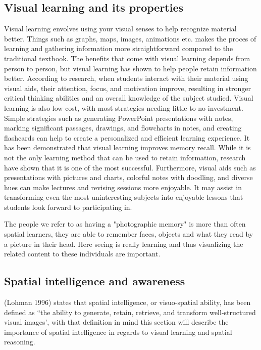 \subsection{Visual learning and its properties}\label{subsec:visualLearningAndItsProperties}
Visual learning envolves using your visual senses to help recognize material better. Things such as graphs, maps, images, animations etc. makes the proces of learning and gathering information more straightforward compared to the traditional textbook. The benefits that come with visual learning depends from person to person, but visual learning has shown to help people retain information better.
According to research, when students interact with their material using visual aids, their attention, focus, and motivation improve, resulting in stronger critical thinking abilities and an overall knowledge of the subject studied. Visual learning is also low-cost, with most strategies needing little to no investment. Simple strategies such as generating PowerPoint presentations with notes, marking significant passages, drawings, and flowcharts in notes, and creating flashcards can help to create a personalized and efficient learning experience.
It has been demonstrated that visual learning improves memory recall. While it is not the only learning method that can be used to retain information, research have shown that it is one of the most successful. Furthermore, visual aids such as presentations with pictures and charts, colorful notes with doodling, and diverse hues can make lectures and revising sessions more enjoyable.
It may assist in transforming even the most uninteresting subjects into enjoyable lessons that students look forward to participating in.\cite{visuallearning}

The people we refer to as having a "photographic memory" is more than often spatial learners, they are able to remember faces, objects and what they read by a picture in their head. Here seeing is really learning and thus visualizing the related content to these individuals are important\cite{herd1997}.

\subsection{Spatial intelligence and awareness}\label{subsec:spatialIntelligenceAndAwareness}
(Lohman 1996) states that spatial intelligence, or visuo-spatial ability, has been defined as ``the ability to generate, retain, retrieve, and transform well-structured visual images'\cite[p97]{tapsfield1996}, with that definition in mind this section will describe the importance of spatial intelligence in regards to visual learning and spatial reasoning.


